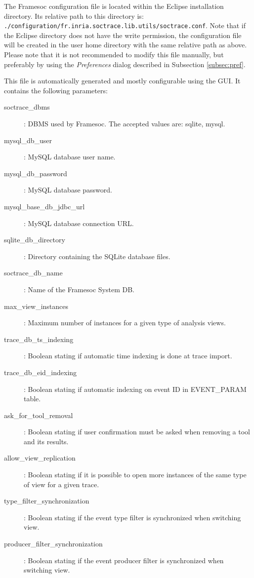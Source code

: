 \documentclass[twoside]{article}
\begin{document}
\begin{sloppypar}
The Framesoc configuration file is located within the Eclipse installation directory.
Its relative path to this directory is:  \texttt{./configuration/fr.inria.soctrace.lib.utils/soctrace.conf}. Note that if the Eclipse directory does not have the write permission, the configuration file will be created in the user home directory with the same relative path as above. Please note that it is not recommended to modify this file manually, but preferably by using the \textit{Preferences} dialog described in Subsection \ref{subsec:pref}. 

This file is automatically generated and mostly configurable using the GUI. 
It contains the following parameters:
\begin{description}
 \item[soctrace\_dbms]: DBMS used by Framesoc. The accepted values are: sqlite, mysql.
 \item[mysql\_db\_user]: MySQL database user name.
 \item[mysql\_db\_password]: MySQL database password.
 \item[mysql\_base\_db\_jdbc\_url]: MySQL database connection URL.
 \item[sqlite\_db\_directory]: Directory containing the SQLite database files.
 \item[soctrace\_db\_name]: Name of the Framesoc System DB.
 \item[max\_view\_instances]: Maximum number of instances for a given type of analysis views.
 \item[trace\_db\_ts\_indexing]: Boolean stating if automatic time indexing is done at trace import.
 \item[trace\_db\_eid\_indexing]: Boolean stating if automatic indexing on event ID in EVENT\_PARAM table.
 \item[ask\_for\_tool\_removal]: Boolean stating if user confirmation must be asked when removing a tool and its results.
 \item[allow\_view\_replication]: Boolean stating if it is possible to open more instances of the same type of view for a given trace.
 \item[type\_filter\_synchronization]: Boolean stating if the event type filter is synchronized when switching view.
 \item[producer\_filter\_synchronization]: Boolean stating if the event producer filter is synchronized when switching view.

\end{description}

\newpage
\renewcommand{\refname}{References}
{}


\end{sloppypar} 
\end{document}
